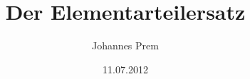
\subject{Proseminar: Modultheorie}
\title{Der Elementarteilersatz}
\author{Johannes Prem}
\date{11.07.2012}

\maketitle
